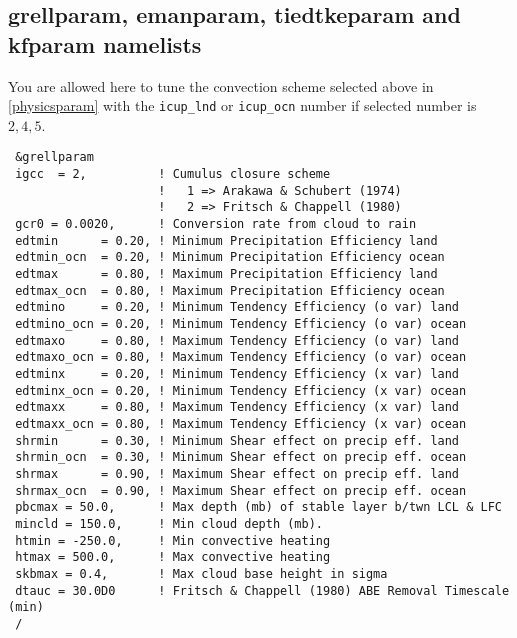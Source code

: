 \subsection{grellparam, emanparam, tiedtkeparam and kfparam namelists}

You are allowed here to tune the convection scheme selected above in
\ref{physicsparam} with the \verb=icup_lnd= or \verb=icup_ocn= number if
selected number is $2, 4, 5$.

{\footnotesize
\begin{Verbatim}
 &grellparam
 igcc  = 2,          ! Cumulus closure scheme
                     !   1 => Arakawa & Schubert (1974)
                     !   2 => Fritsch & Chappell (1980)
 gcr0 = 0.0020,      ! Conversion rate from cloud to rain
 edtmin      = 0.20, ! Minimum Precipitation Efficiency land
 edtmin_ocn  = 0.20, ! Minimum Precipitation Efficiency ocean
 edtmax      = 0.80, ! Maximum Precipitation Efficiency land
 edtmax_ocn  = 0.80, ! Maximum Precipitation Efficiency ocean
 edtmino     = 0.20, ! Minimum Tendency Efficiency (o var) land
 edtmino_ocn = 0.20, ! Minimum Tendency Efficiency (o var) ocean
 edtmaxo     = 0.80, ! Maximum Tendency Efficiency (o var) land
 edtmaxo_ocn = 0.80, ! Maximum Tendency Efficiency (o var) ocean
 edtminx     = 0.20, ! Minimum Tendency Efficiency (x var) land
 edtminx_ocn = 0.20, ! Minimum Tendency Efficiency (x var) ocean
 edtmaxx     = 0.80, ! Maximum Tendency Efficiency (x var) land
 edtmaxx_ocn = 0.80, ! Maximum Tendency Efficiency (x var) ocean
 shrmin      = 0.30, ! Minimum Shear effect on precip eff. land
 shrmin_ocn  = 0.30, ! Minimum Shear effect on precip eff. ocean
 shrmax      = 0.90, ! Maximum Shear effect on precip eff. land
 shrmax_ocn  = 0.90, ! Maximum Shear effect on precip eff. ocean
 pbcmax = 50.0,      ! Max depth (mb) of stable layer b/twn LCL & LFC
 mincld = 150.0,     ! Min cloud depth (mb).
 htmin = -250.0,     ! Min convective heating
 htmax = 500.0,      ! Max convective heating
 skbmax = 0.4,       ! Max cloud base height in sigma
 dtauc = 30.0D0      ! Fritsch & Chappell (1980) ABE Removal Timescale (min)
 /


\end{Verbatim}}
